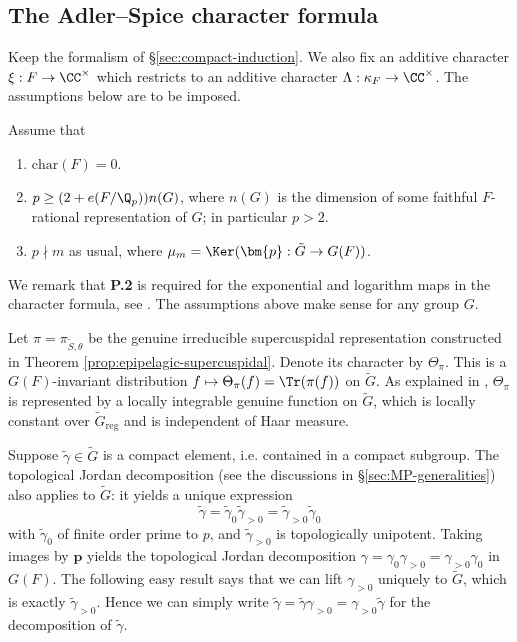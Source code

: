 \documentclass[a4paper,10pt]{article}
\begin{document}
\subsection{The Adler--Spice character formula}\label{sec:Adler-Spice}
Keep the formalism of \S\ref{sec:compact-induction}. We also fix an additive character $\xi: F \to \CC^\times$ which restricts to an additive character $\Lambda: \kappa_F \to \CC^\times$. The assumptions below are to be imposed.
\begin{hypothesis}\label{hyp:p-large}
	Assume that
	\begin{enumerate}[\bfseries P.1]
		\item $\text{char}(F)=0$.
		\item $p \geq (2+e(F/\Q_p)) n(G)$, where $n(G)$ is the dimension of some faithful $F$-rational representation of $G$; in particular $p > 2$.
		\item $p \nmid m$ as usual, where $\mu_m = \Ker(\bm{p}: \tilde{G} \to G(F))$.
	\end{enumerate}
	We remark that \textbf{P.2} is required for the exponential and logarithm maps in the character formula, see \cite[Appendix B]{DR09}. The assumptions above make sense for any group $G$.
\end{hypothesis}

Let $\pi = \pi_{\tilde{S}, \theta}$ be the genuine irreducible supercuspidal representation constructed in Theorem \ref{prop:epipelagic-supercuspidal}. Denote its character by $\Theta_\pi$. This is a $G(F)$-invariant distribution $f \mapsto \Theta_\pi(f) = \Tr(\pi(f))$ on $\tilde{G}$. As explained in \cite{Li12b}, $\Theta_\pi$ is represented by a locally integrable genuine function on $\tilde{G}$, which is locally constant over $\tilde{G}_{\text{reg}}$ and is independent of Haar measure.

\begin{notation}
	Suppose $\tilde{\gamma} \in \tilde{G}$ is a compact element, i.e. contained in a compact subgroup. The topological Jordan decomposition (see the discussions in \S\ref{sec:MP-generalities}) also applies to $\tilde{G}$: it yields a unique expression
	\[ \tilde{\gamma} = \tilde{\gamma}_0 \tilde{\gamma}_{>0} = \tilde{\gamma}_{>0} \tilde{\gamma}_0 \]
	with $\tilde{\gamma}_0$ of finite order prime to $p$, and $\tilde{\gamma}_{>0}$ is topologically unipotent. Taking images by $\bm{p}$ yields the topological Jordan decomposition $\gamma = \gamma_0 \gamma_{>0} = \gamma_{>0} \gamma_0$ in $G(F)$. The following easy result says that we can lift $\gamma_{>0}$ uniquely to $\tilde{G}$, which is exactly $\tilde{\gamma}_{>0}$. Hence we can simply write $\tilde{\gamma} = \tilde{\gamma} \gamma_{>0} = \gamma_{>0} \tilde{\gamma}$ for the decomposition of $\tilde{\gamma}$.
\end{notation}
\end{document}
